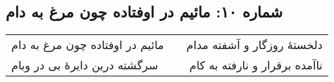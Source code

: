 \begin{center}
\section*{شماره ۱۰: مائیم در اوفتاده چون مرغ به دام}
\label{sec:010}
\begin{longtable}{l p{0.5cm} r}
مائیم در اوفتاده چون مرغ به دام
&&
دلخستهٔ روزگار و آشفته مدام
\\
سرگشته درین دایرهٔ بی در وبام
&&
ناآمده برقرار و نارفته به کام
\\
\end{longtable}
\end{center}
